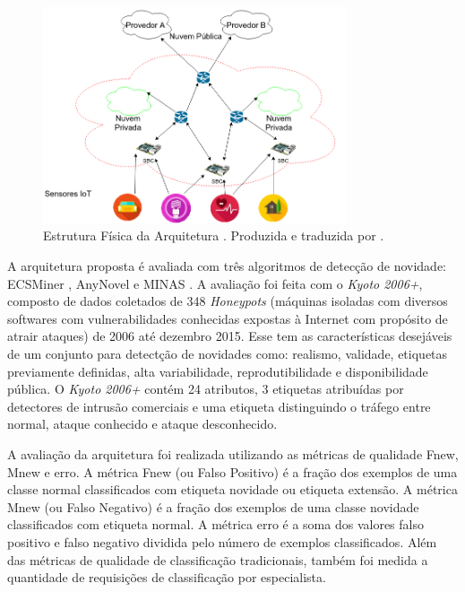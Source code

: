 \begin{figure}[ht]
\centering
\includegraphics[width=0.8\textwidth]{figuras/idsa-iot-quali-000.png}
\caption{Estrutura Física da Arquitetura \idsiot.
Produzida e traduzida por .}
\label{fig:ids-iot-phy}
\end{figure}

A arquitetura proposta é avaliada com três algoritmos de detecção de novidade:
ECSMiner \cite{Masud2010ECSMiner}, AnyNovel \cite{Abdallah2016anynovel} e MINAS
\cite{Faria2016minas}.
A avaliação foi feita com o \dataset \emph{Kyoto 2006+}, composto de
dados coletados de 348 \emph{Honeypots} (máquinas isoladas com diversos
softwares com vulnerabilidades conhecidas expostas à Internet com propósito de
atrair ataques) de 2006 até dezembro 2015.
Esse \dataset tem as características desejáveis de um conjunto para detectção de
novidades como: realismo, validade, etiquetas previamente definidas, alta
variabilidade, reprodutibilidade e disponibilidade pública.
O \dataset \emph{Kyoto 2006+} contém 24 atributos, 3 etiquetas atribuídas por
detectores de intrusão comerciais e uma etiqueta
distinguindo o tráfego entre normal, ataque conhecido e ataque desconhecido.

A avaliação da arquitetura foi realizada utilizando as métricas de qualidade
Fnew, Mnew e erro.
A métrica Fnew (ou Falso Positivo) é a fração dos exemplos de uma classe normal
classificados com etiqueta novidade ou etiqueta extensão.
A métrica Mnew (ou Falso Negativo) é a fração dos exemplos de uma classe novidade
classificados com etiqueta normal.
A métrica erro é a soma dos valores falso positivo e falso negativo dividida
pelo número de exemplos classificados.
Além das métricas de qualidade de classificação tradicionais, também foi medida
a quantidade de requisições de classificação por especialista.

